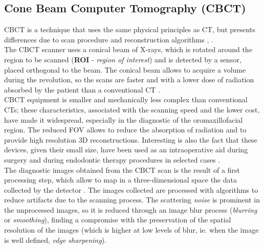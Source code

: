 \subsection{Cone Beam Computer Tomography (CBCT)}
CBCT is a technique that uses the same physical principles as CT, but presents differences due to scan procedure and reconstruction algorithms \parencite{Reference12}, \parencite{Reference13}.\\
The CBCT scanner uses a conical beam of X-rays, which is rotated around the region to be scanned (\textbf{ROI} - \emph{region of interest}) and is detected by a sensor, placed orthogonal to the beam. The conical beam allows to acquire a volume during the revolution, so the scans are faster and with a lower dose of radiation absorbed by the patient than a conventional CT \parencite{Reference14}. \\
CBCT equipment is smaller and mechanically less complex than conventional CTs; these characteristics, associated with the scanning speed and the lower cost, have made it widespread, especially in the diagnostic of the oromaxillofacial region. The reduced FOV allows to reduce the absorption of radiation and to provide high resolution 3D reconstructions. Interesting is also the fact that these devices, given their small size, have been used as an intraoperative aid during surgery \parencite{Reference15} and during endodontic therapy procedures in selected cases \parencite{Reference16}. \\ 
The diagnostic images obtained from the CBCT scan is the result of a first processing step, which allow to map in a three-dimensional space the data collected by the detector \parencite{Reference11}. The images collected are processed with algorithms to reduce artifacts due to the scanning process. The scattering \emph{noise} is prominent in the unprocessed images, so it is reduced through an image blur process (\emph{blurring} or \emph{smoothing}), finding a compromise with the preservation of the spatial resolution of the images (which is higher at low levels of blur, ie. when the image is well defined, \emph{edge sharpening}). \\
